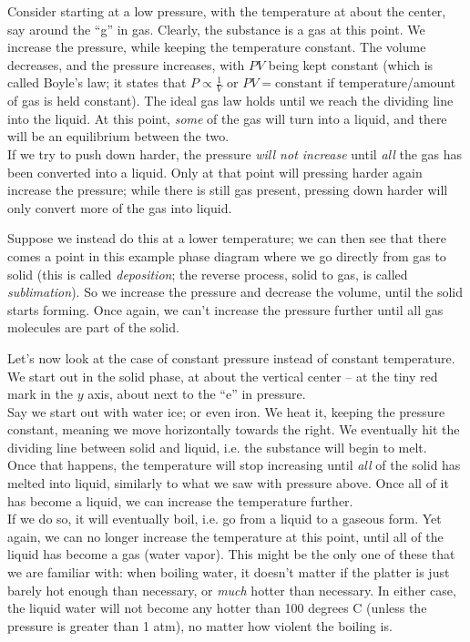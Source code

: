 Consider starting at a low pressure, with the temperature at about the center, say around the ``g'' in gas. Clearly, the substance is a gas at this point. We increase the pressure,  while keeping the temperature constant. The volume decreases, and the pressure increases, with $P V$ being kept constant (which is called Boyle's law; it states that $P \propto \frac{1}{V}$ or $PV = \text{constant}$ if temperature/amount of gas is held constant). The ideal gas law holds until we reach the dividing line into the liquid. At this point, \emph{some} of the gas will turn into a liquid, and there will be an equilibrium between the two.\\
If we try to push down harder, the pressure \emph{will not increase} until \emph{all} the gas has been converted into a liquid. Only at that point will pressing harder again increase the pressure; while there is still gas present, pressing down harder will only convert more of the gas into liquid.

Suppose we instead do this at a lower temperature; we can then see that there comes a point in this example phase diagram where we go directly from gas to solid (this is called \emph{deposition}; the reverse process, solid to gas, is called \emph{sublimation}). So we increase the pressure and decrease the volume, until the solid starts forming. Once again, we can't increase the pressure further until all gas molecules are part of the solid.

Let's now look at the case of constant pressure instead of constant temperature.\\
We start out in the solid phase, at about the vertical center -- at the tiny red mark in the $y$ axis, about next to the ``e'' in pressure.\\
Say we start out with water ice; or even iron. We heat it, keeping the pressure constant, meaning we move horizontally towards the right. We eventually hit the dividing line between solid and liquid, i.e. the substance will begin to melt.\\
Once that happens, the temperature will stop increasing until \emph{all} of the solid has melted into liquid, similarly to what we saw with pressure above. Once all of it has become a liquid, we can increase the temperature further.\\
If we do so, it will eventually boil, i.e. go from a liquid to a gaseous form. Yet again, we can no longer increase the temperature at this point, until all of the liquid has become a gas (water vapor). This might be the only one of these that we are familiar with: when boiling water, it doesn't matter if the platter is just barely hot enough than necessary, or \emph{much} hotter than necessary. In either case, the liquid water will not become any hotter than 100 degrees C (unless the pressure is greater than 1 atm), no matter how violent the boiling is.

